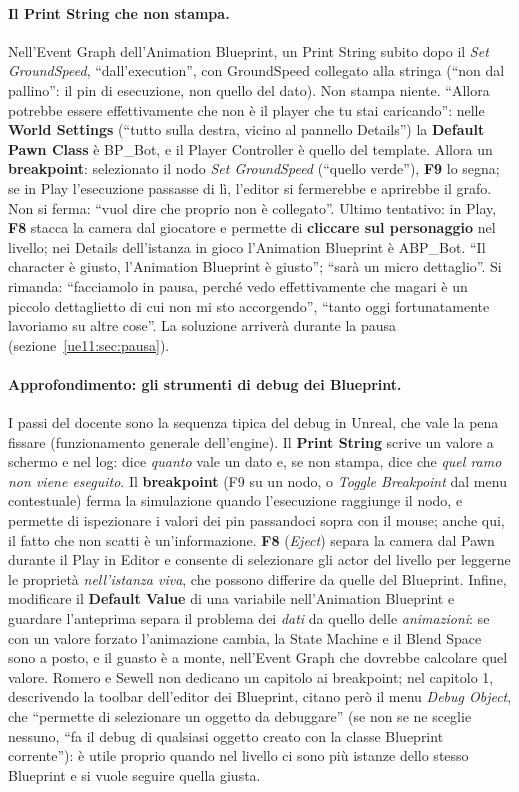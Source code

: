 \paragraph{Il Print String che non stampa.} Nell'Event Graph dell'Animation Blueprint, un
Print String subito dopo il \emph{Set GroundSpeed}, ``dall'execution'', con GroundSpeed
collegato alla stringa (``non dal pallino'': il pin di esecuzione, non quello del dato).
Non stampa niente. ``Allora potrebbe essere effettivamente che non è il player che tu
stai caricando'': nelle \textbf{World Settings} (``tutto sulla destra, vicino al pannello
Details'') la \textbf{Default Pawn Class} è BP\_Bot, e il Player Controller è quello del
template. Allora un \textbf{breakpoint}: selezionato il nodo \emph{Set GroundSpeed}
(``quello verde''), \textbf{F9} lo segna; se in Play l'esecuzione passasse di lì, l'editor
si fermerebbe e aprirebbe il grafo. Non si ferma: ``vuol dire che proprio non è collegato''.
Ultimo tentativo: in Play, \textbf{F8} stacca la camera dal giocatore e permette di
\textbf{cliccare sul personaggio} nel livello; nei Details dell'istanza in gioco l'Animation
Blueprint è ABP\_Bot. ``Il character è giusto, l'Animation Blueprint è giusto''; ``sarà un
micro dettaglio''. Si rimanda: ``facciamolo in pausa, perché vedo effettivamente che magari
è un piccolo dettaglietto di cui non mi sto accorgendo'', ``tanto oggi fortunatamente
lavoriamo su altre cose''. La soluzione arriverà durante la pausa
(sezione~\ref{ue11:sec:pausa}).

\paragraph{Approfondimento: gli strumenti di debug dei Blueprint.} I passi del docente sono
la sequenza tipica del debug in Unreal, che vale la pena fissare (funzionamento generale
dell'engine). Il \textbf{Print String} scrive un valore a schermo e nel log: dice
\emph{quanto} vale un dato e, se non stampa, dice che \emph{quel ramo non viene eseguito}.
Il \textbf{breakpoint} (F9 su un nodo, o \emph{Toggle Breakpoint} dal menu contestuale)
ferma la simulazione quando l'esecuzione raggiunge il nodo, e permette di ispezionare i
valori dei pin passandoci sopra con il mouse; anche qui, il fatto che non scatti è
un'informazione. \textbf{F8} (\emph{Eject}) separa la camera dal Pawn durante il Play in
Editor e consente di selezionare gli actor del livello per leggerne le proprietà
\emph{nell'istanza viva}, che possono differire da quelle del Blueprint. Infine, modificare
il \textbf{Default Value} di una variabile nell'Animation Blueprint e guardare
l'anteprima separa il problema dei \emph{dati} da quello delle \emph{animazioni}: se con un
valore forzato l'animazione cambia, la State Machine e il Blend Space sono a posto, e il
guasto è a monte, nell'Event Graph che dovrebbe calcolare quel valore. Romero e Sewell non
dedicano un capitolo ai breakpoint; nel capitolo 1, descrivendo la toolbar dell'editor dei
Blueprint, citano però il menu \emph{Debug Object}, che ``permette di selezionare un
oggetto da debuggare'' (se non se ne sceglie nessuno, ``fa il debug di qualsiasi oggetto
creato con la classe Blueprint corrente''): è utile proprio quando nel livello ci sono più
istanze dello stesso Blueprint e si vuole seguire quella giusta.

